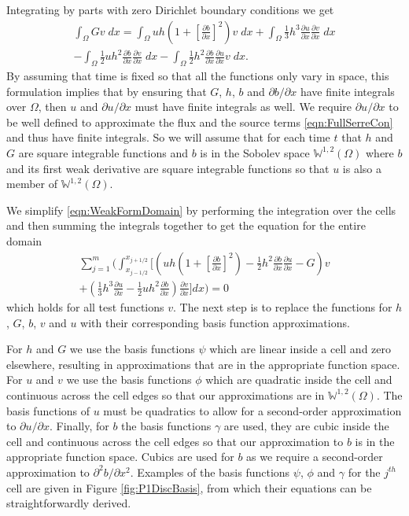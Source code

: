 \documentclass[times]{elsarticle}
\begin{document}
Integrating by parts with zero Dirichlet boundary conditions we get
\begin{multline}
\int_{\Omega } G v \; dx = \int_{\Omega } uh \left(1 + \left[\frac{\partial b}{\partial x}\right]^2 \right) v \; dx +  \int_{\Omega } \frac{1}{3}h^3  \frac{\partial {u}}{\partial x} \frac{\partial v}{\partial x} \; dx  \\ - 
\int_{\Omega }   \frac{1}{2} u h^2\frac{\partial b}{\partial x}  \frac{\partial v }{\partial x}\; dx - 
\int_{\Omega }   \frac{1}{2}h^2\frac{\partial b}{\partial x}  \frac{\partial u }{\partial x}v \; dx.
\label{eqn:WeakFormDomain}
\end{multline}
By assuming that time is fixed so that all the functions only vary in space, this formulation implies that by ensuring that $G$, $h$, $b$ and $\partial b / \partial x$ have finite integrals over $\Omega$, then $u$ and $\partial u / \partial x$ must have finite integrals as well. We require $\partial u / \partial x$ to be well defined to approximate the flux and the source terms \eqref{eqn:FullSerreCon} and thus have finite integrals. So we will assume that for each time $t$ that $h$ and $G$ are square integrable functions and $b$ is in the Sobolev space $\mathbb{W}^{1,2}(\Omega)$ where $b$ and its first weak derivative are square integrable functions so that $u$ is also a member of $\mathbb{W}^{1,2}(\Omega)$.

We simplify \eqref{eqn:WeakFormDomain} by performing the integration over the cells and then summing the integrals together to get the equation for the entire domain
\begin{multline}
\label{eq:elementwiseint}
\sum_{j=1}^m \Bigg(  \int_{x_{j-1/2} }^{{x_{j+1/2}}} \Bigg[  \left( uh \left(1 + \left[\frac{\partial b}{\partial x}\right]^2 \right)  - \frac{1}{2}h^2\frac{\partial b}{\partial x}  \frac{\partial u }{\partial x}  -  G \right) v   \\ +  \left(\frac{1}{3}h^3  \frac{\partial {u}}{\partial x}    -     \frac{1}{2} uh^2\frac{\partial b}{\partial x}    \right) \frac{\partial v }{\partial x} \Bigg]dx \Bigg)  = 0
\end{multline}
which holds for all test functions $v$. The next step is to replace the functions for $h$, $G$, $b$, $v$ and $u$ with their corresponding basis function approximations.

For $h$ and $G$ we use the basis functions $\psi$ which are linear inside a cell and zero elsewhere, resulting in approximations that are in the appropriate function space.
For $u$ and $v$ we use the basis functions $\phi$ which are quadratic inside the cell and continuous across the cell edges so that our approximations are in $\mathbb{W}^{1,2}(\Omega)$. The basis functions of $u$ must be quadratics to allow for a second-order approximation to $\partial u / \partial x$. Finally, for $b$ the basis functions $\gamma$ are used, they are cubic inside the cell and continuous across the cell edges so that our approximation to $b$ is in the appropriate function space. Cubics are used for $b$ as we require a second-order approximation to $\partial^2 b / \partial x^2$. Examples of the basis functions $\psi$, $\phi$ and $\gamma$ for the $j^{th}$ cell are given in Figure \ref{fig:P1DiscBasis}, from which their equations can be straightforwardly derived.
\end{document}
